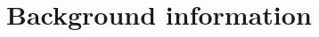 \documentclass[b5paper,11 pt]{report}
\begin{document}
\pagestyle{empty} %
\tableofcontents %
\cleardoublepage %
\pagestyle{plain} %
\setcounter{page}{1} %








\chapter{Background information} 	%
\end{document}
